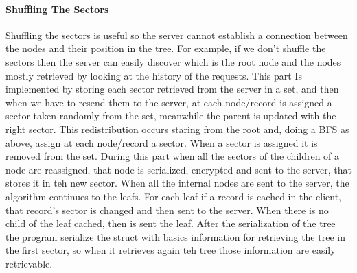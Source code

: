 \paragraph{Shuffling The Sectors}
Shuffling the sectors is useful so the server cannot establish a connection between the nodes and their position in the tree. For example, if we don't shuffle the sectors then the server can easily discover which is the root node and the nodes mostly retrieved by looking at the history of the requests.
This part Is implemented by storing each sector retrieved from the server in a set, and then when we have to resend them to the server, at each node/record is assigned a sector taken randomly from the set, meanwhile the parent is updated with the right sector. This redistribution occurs staring from the root and, doing a BFS as above, assign at each node/record a sector. When a sector is assigned it is removed from the set. 
During this part when all the sectors of the children of a node are reassigned, that node is serialized, encrypted and sent to the server, that stores it in teh new sector. When all the internal nodes are sent to the server, the algorithm continues to the leafs.
For each leaf if a record is cached in the client, that record's sector is changed and then sent to the server. When there is no child of the leaf cached, then is sent the leaf. 
After the serialization of the tree the program serialize the struct with basics information for retrieving the tree in the first sector, so when it retrieves again teh tree those information are easily retrievable.
